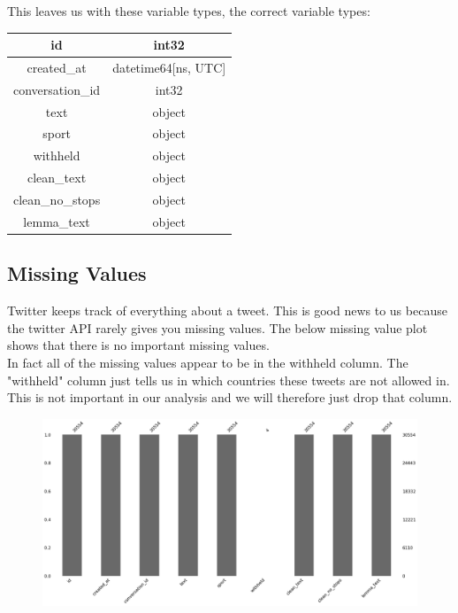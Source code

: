 \documentclass[12pt]{article}
\begin{document}
            This leaves us with these variable types, the correct variable types:
            
            \begin{center}
                \begin{tabular}{|c|c|}
                    \hline
                    id & int32\\
                    \hline
                    created\_at & datetime64[ns, UTC]\\
                    \hline
                    conversation\_id & int32\\
                    \hline
                    text & object\\
                    \hline
                    sport & object\\
                    \hline
                    withheld & object\\
                    \hline
                    clean\_text & object\\
                    \hline
                    clean\_no\_stops & object\\
                    \hline
                    lemma\_text & object\\
                    \hline
                \end{tabular}
            \end{center}
        \subsection{Missing Values}
            Twitter keeps track of everything about a tweet. This is good news to us because the twitter API rarely gives you missing values. The below missing value plot shows that there is no 
            important missing values. \\

            In fact all of the missing values appear to be in the withheld column. The "withheld" column just tells us in which countries these tweets are not allowed in. This is not
            important in our analysis and we will therefore just drop that column.
            \begin{figure}[H]
                \centering
                \includegraphics[scale=0.33]{missing.png}
            \end{figure}
\end{document}

